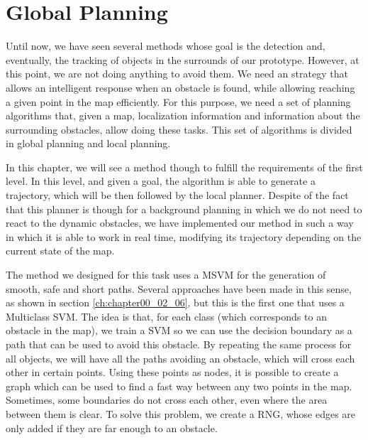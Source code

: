 
\graphicspath{{./images/chapter06/bmps/}{./images/chapter06/vects/}{./images/chapter06/}}

\chapter{Global Planning}\label{ch:chapter06}

Until now, we have seen several methods whose goal is the detection and, eventually, the tracking of objects in the surrounds of our prototype. However, at this point, we are not doing anything to avoid them. We need an strategy that allows an intelligent response when an obstacle is found, while allowing reaching a given point in the map efficiently. For this purpose, we need a set of planning algorithms that, given a map, localization information and information about the surrounding obstacles, allow doing these tasks. This set of algorithms is divided in global planning and local planning.

In this chapter, we will see a method though to fulfill the requirements of the first level. In this level, and given a goal, the algorithm is able to generate a trajectory, which will be then followed by the local planner. Despite of the fact that this planner is though for a background planning in which we do not need to react to the dynamic obstacles, we have implemented our method in such a way in which it is able to work in real time, modifying its trajectory depending on the current state of the map.

The method we designed for this task uses a \ac{MSVM} for the generation of smooth, safe and short paths. Several approaches have been made in this sense, as shown in section \ref{ch:chapter00_02_06}, but this is the first one that uses a Multiclass \ac{SVM}. The idea is that, for each class (which corresponds to an obstacle in the map), we train a \ac{SVM} so we can use the decision boundary as a path that can be used to avoid this obstacle. By repeating the same process for all objects, we will have all the paths avoiding an obstacle, which will cross each other in certain points. Using these points as nodes, it is possible to create a graph which can be used to find a fast way between any two points in the map. Sometimes, some boundaries do not cross each other, even where the area between them is clear. To solve this problem, we create a \ac{RNG}, whose edges are only added if they are far enough to an obstacle.

